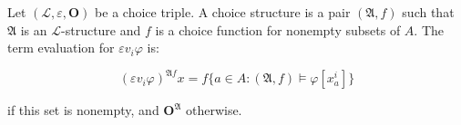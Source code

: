 Let $(\mathcal{L}, \varepsilon, \mathbf{O})$ be a choice triple. A choice structure is a pair $(\mathfrak{A}, f)$ such that $\mathfrak{A}$ is an $\mathcal{L}$-structure and $f$ is a choice function for nonempty subsets of $A$. The term evaluation for $\varepsilon v_i \varphi$ is:

$$(\varepsilon v_i \varphi)^{\mathfrak{A}f}x = f\{a \in A : (\mathfrak{A}, f) \models \varphi[x_a^i]\}$$

if this set is nonempty, and $\mathbf{O}^{\mathfrak{A}}$ otherwise.
